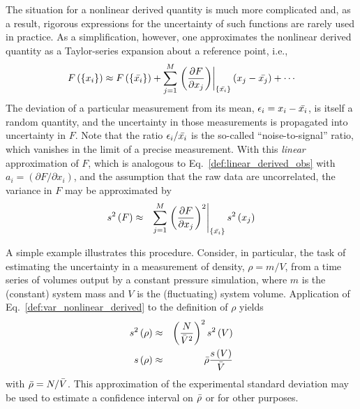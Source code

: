 The situation for a nonlinear derived quantity is much more complicated and, as a result, rigorous expressions for the uncertainty of such functions are rarely used in practice. As a simplification, however, one approximates the nonlinear derived quantity as a Taylor-series expansion about a reference point, i.e.,
%
\begin{equation}
  F\left( \left\{x_i\right\} \right)
  \approx
  F\left( \left\{\mean{x_i}\right\} \right)
  + \sum_{j=1}^M \left.
    \left( \dfrac{\partial F}{\partial x_j}\right)
  \right|_{\left\{\mean{x_i}\right\}}
  \left(x_j - \mean{x_j}\right) + \cdots
  \label{def:nonlinear_derived_obs_taylor}
\end{equation}
%
The deviation of a particular measurement from its mean, $\epsilon_i = x_i - \bar{x_i}$, is itself a random quantity, and the uncertainty in those measurements is propagated into uncertainty in $F$.
Note that the ratio $\epsilon_i/\bar{x_i}$ is the so-called ``noise-to-signal'' ratio, which vanishes in the limit of a precise measurement. 
With this {\it linear} approximation of $F$, which is analogous to Eq.~\ref{def:linear_derived_obs} with $a_i = \left( \partial F/\partial x_i\right)$, and the assumption that the raw data are uncorrelated, the variance in $F$ may be approximated by
%
\begin{eqnarray}
  s^2\left( F \right) & \approx & \sum_{j=1}^M
                \left.
                \left( \dfrac{\partial F}{\partial x_j} \right)^2 
                \right|_{\left\{\bar{x_i}\right\}}
                s^2\left( x_j \right)
  \label{def:var_nonlinear_derived}
\end{eqnarray}
%

A simple example illustrates this procedure.
Consider, in particular, the task of estimating the uncertainty in a measurement of density, $\rho=m/V$, from a time series of volumes output by a constant pressure simulation, where $m$ is the (constant) system mass and $V$ is the (fluctuating) system volume.
Application of Eq.~\ref{def:var_nonlinear_derived} to the definition of $\rho$ yields
%
\begin{eqnarray}
  s^2\left( \rho \right) & \approx & \left( \dfrac{N}{\bar{V}^2} \right)^2 s^2\left( V \right) \\
  s\left( \rho \right) & \approx & \bar{\rho} \dfrac{s\left( V \right)}{\bar{V}}
  \label{ex:density_linearized}
\end{eqnarray}
%
with $\bar{\rho} = N/\bar{V}$.
This approximation of the experimental standard deviation may be used to estimate a confidence interval on $\bar{\rho}$ or for other purposes.

